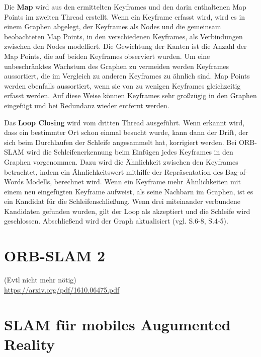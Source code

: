 Die \textbf{Map} wird aus den ermittelten Keyframes und den darin enthaltenen Map Points im zweiten Thread erstellt. Wenn ein Keyframe erfasst wird, wird es in einem Graphen abgelegt, der Keyframes als Nodes und die gemeinsam beobachteten Map Points, in den verschiedenen Keyframes, als Verbindungen zwischen den Nodes modelliert. Die Gewichtung der Kanten ist die Anzahl der Map Points, die auf beiden Keyframes observiert wurden. Um eine unbeschränktes Wachstum des Graphen zu vermeiden werden Keyframes aussortiert, die im Vergleich zu anderen Keyframes zu ähnlich sind. Map Points werden ebenfalls aussortiert, wenn sie von zu wenigen Keyframes gleichzeitig erfasst werden. Auf diese Weise können Keyframes sehr großzügig in den Graphen eingefügt und bei Redundanz wieder entfernt werden.

Das \textbf{Loop Closing} wird vom dritten Thread ausgeführt. Wenn erkannt wird, dass ein bestimmter Ort schon einmal besucht wurde, kann dann der Drift, der sich beim Durchlaufen der Schleife angesammelt hat, korrigiert werden. Bei ORB-SLAM wird die Schleifenerkennung beim Einfügen jedes Keyframes in den Graphen vorgenommen. Dazu wird die Ähnlichkeit zwischen den Keyframes betrachtet, indem ein Ähnlichkeitswert mithilfe der Repräsentation des \glqq Bag-of-Words\grqq{} Modells, berechnet wird. Wenn ein Keyframe mehr Ähnlichkeiten mit einem neu eingefügten Keyframe aufweist, als seine Nachbarn im Graphen, ist es ein Kandidat für die Schleifenschließung. Wenn drei miteinander verbundene Kandidaten gefunden wurden, gilt der Loop als akzeptiert und die Schleife wird geschlossen. Abschließend wird der Graph aktualisiert (vgl. \cite{orbslam_og} S.6-8, \cite{orb_slam} S.4-5).


\section{ORB-SLAM 2}

(Evtl nicht mehr nötig)\\
\url{https://arxiv.org/pdf/1610.06475.pdf}




\section{SLAM für mobiles Augumented Reality}

